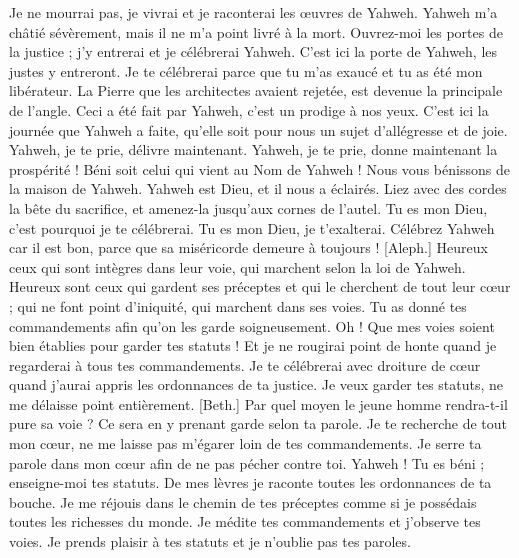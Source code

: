 \begin{multicols}{2}
Je ne mourrai pas, je vivrai et je raconterai les œuvres de Yahweh.
Yahweh m'a châtié sévèrement, mais il ne m'a point livré à la mort.
Ouvrez-moi les portes de la justice ; j'y entrerai et je célébrerai Yahweh.
C'est ici la porte de Yahweh, les justes y entreront.
Je te célébrerai parce que tu m'as exaucé et tu as été mon libérateur.
La Pierre que les architectes avaient rejetée, est devenue la principale de l'angle.
Ceci a été fait par Yahweh, c'est un prodige à nos yeux.
C'est ici la journée que Yahweh a faite, qu'elle soit pour nous un sujet d'allégresse et de joie.
Yahweh, je te prie, délivre maintenant. Yahweh, je te prie, donne maintenant la prospérité !
Béni soit celui qui vient au Nom de Yahweh ! Nous vous bénissons de la maison de Yahweh.
Yahweh est Dieu, et il nous a éclairés. Liez avec des cordes la bête du sacrifice, et amenez-la jusqu'aux cornes de l'autel.
Tu es mon Dieu, c'est pourquoi je te célébrerai. Tu es mon Dieu, je t'exalterai.
Célébrez Yahweh car il est bon, parce que sa miséricorde demeure à toujours !
\VerseOne{}[Aleph.] Heureux ceux qui sont intègres dans leur voie, qui marchent selon la loi de Yahweh.
Heureux sont ceux qui gardent ses préceptes et qui le cherchent de tout leur cœur ;
qui ne font point d'iniquité, qui marchent dans ses voies.
Tu as donné tes commandements afin qu'on les garde soigneusement.
Oh ! Que mes voies soient bien établies pour garder tes statuts !
Et je ne rougirai point de honte quand je regarderai à tous tes commandements.
Je te célébrerai avec droiture de cœur quand j'aurai appris les ordonnances de ta justice.
Je veux garder tes statuts, ne me délaisse point entièrement.
[Beth.] Par quel moyen le jeune homme rendra-t-il pure sa voie ? Ce sera en y prenant garde selon ta parole.
Je te recherche de tout mon cœur, ne me laisse pas m'égarer loin de tes commandements.
Je serre ta parole dans mon cœur afin de ne pas pécher contre toi.
Yahweh ! Tu es béni ; enseigne-moi tes statuts.
De mes lèvres je raconte toutes les ordonnances de ta bouche.
Je me réjouis dans le chemin de tes préceptes comme si je possédais toutes les richesses du monde.
Je médite tes commandements et j'observe tes voies.
Je prends plaisir à tes statuts et je n'oublie pas tes paroles.

\end{multicols}
